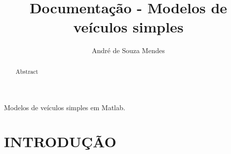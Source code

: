 \documentclass[sublist]{fei}
\author{André de Souza Mendes}
\title{Documentação - Modelos de veículos simples}
\begin{document}
\maketitle






\begin{resumo}
Modelos de veículos simples em Matlab.
\end{resumo}

\begin{abstract}
Abstract
\end{abstract}

{
	\pagestyle{empty}
	\listoffigures
	\listoftables
    \tableofcontents
}














\chapter{INTRODUÇÃO} 
\end{document}
